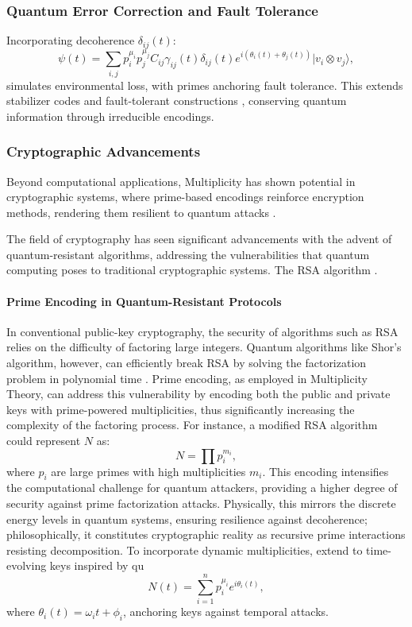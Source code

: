 \documentclass{article}
\theoremstyle{plain}
\begin{document}
\begin{enumerate}
\subsubsection{Quantum Error Correction and Fault Tolerance}
Incorporating decoherence $\delta_{ij}(t)$:
\begin{equation}
\psi(t) = \sum_{i,j} p_i^{\mu_i} p_j^{\mu_j} C_{ij} \gamma_{ij}(t) \delta_{ij}(t) e^{i (\theta_i(t) + \theta_j(t))} |v_i \otimes v_j\rangle,
\end{equation}
simulates environmental loss, with primes anchoring fault tolerance. This extends stabilizer codes and fault-tolerant constructions \cite{gottesman1997}, conserving quantum information through irreducible encodings.


\subsubsection{Cryptographic Advancements}
Beyond computational applications, Multiplicity has shown potential in cryptographic systems, where prime-based encodings reinforce encryption methods, rendering them resilient to quantum attacks \cite{NISTPQC2024}.

The field of cryptography has seen significant advancements with the advent of quantum-resistant algorithms, addressing the vulnerabilities that quantum computing poses to traditional cryptographic systems. The RSA algorithm \cite{RivestShamirAdleman1978}.

\paragraph{Prime Encoding in Quantum-Resistant Protocols}
In conventional public-key cryptography, the security of algorithms such as RSA relies on the difficulty of factoring large integers. Quantum algorithms like Shor’s algorithm, however, can efficiently break RSA by solving the factorization problem in polynomial time \cite{shor1997}. Prime encoding, as employed in Multiplicity Theory, can address this vulnerability by encoding both the public and private keys with prime-powered multiplicities, thus significantly increasing the complexity of the factoring process. For instance, a modified RSA algorithm could represent $N$ as:
\begin{equation}
N = \prod p_i^{m_i},
\end{equation}
where $p_i$ are large primes with high multiplicities $m_i$. This encoding intensifies the computational challenge for quantum attackers, providing a higher degree of security against prime factorization attacks. Physically, this mirrors the discrete energy levels in quantum systems, ensuring resilience against decoherence; philosophically, it constitutes cryptographic reality as recursive prime interactions resisting decomposition.
To incorporate dynamic multiplicities, extend to time-evolving keys inspired by qu
\begin{equation}
N(t) = \sum_{i=1}^n p_i^{\mu_i} e^{i \theta_i(t)},
\end{equation}
where $\theta_i(t) = \omega_i t + \phi_i$, anchoring keys against temporal attacks.


\end{enumerate}
\end{document}
